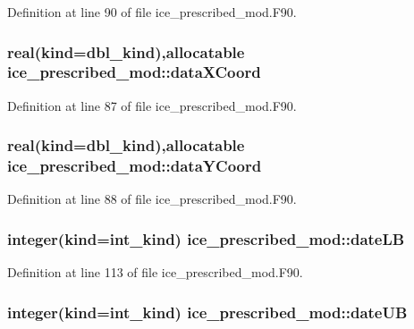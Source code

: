 Definition at line 90 of file ice\_\-prescribed\_\-mod.F90.\hypertarget{namespaceice__prescribed__mod_a05759838d18f2fbc703a6ff43bdc217b}{
\subsubsection[{dataXCoord}]{\setlength{\rightskip}{0pt plus 5cm}real(kind=dbl\_\-kind),allocatable {\bf ice\_\-prescribed\_\-mod::dataXCoord}}}
\label{namespaceice__prescribed__mod_a05759838d18f2fbc703a6ff43bdc217b}


Definition at line 87 of file ice\_\-prescribed\_\-mod.F90.\hypertarget{namespaceice__prescribed__mod_abf3b4ab489983d1531847794139e9397}{
\subsubsection[{dataYCoord}]{\setlength{\rightskip}{0pt plus 5cm}real(kind=dbl\_\-kind),allocatable {\bf ice\_\-prescribed\_\-mod::dataYCoord}}}
\label{namespaceice__prescribed__mod_abf3b4ab489983d1531847794139e9397}


Definition at line 88 of file ice\_\-prescribed\_\-mod.F90.\hypertarget{namespaceice__prescribed__mod_a43e79eec4249cc4e5883bebc24835c94}{
\subsubsection[{dateLB}]{\setlength{\rightskip}{0pt plus 5cm}integer(kind=int\_\-kind) {\bf ice\_\-prescribed\_\-mod::dateLB}}}
\label{namespaceice__prescribed__mod_a43e79eec4249cc4e5883bebc24835c94}


Definition at line 113 of file ice\_\-prescribed\_\-mod.F90.\hypertarget{namespaceice__prescribed__mod_ad31a8b9239fb1c5cca528bc20733ba0a}{
\subsubsection[{dateUB}]{\setlength{\rightskip}{0pt plus 5cm}integer(kind=int\_\-kind) {\bf ice\_\-prescribed\_\-mod::dateUB}}}
\label{namespaceice__prescribed__mod_ad31a8b9239fb1c5cca528bc20733ba0a}


